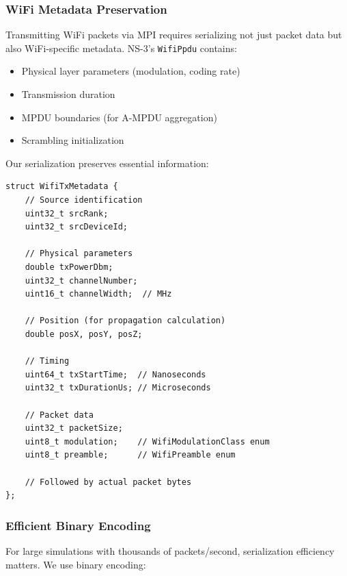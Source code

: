 \subsubsection{WiFi Metadata Preservation}

Transmitting WiFi packets via MPI requires serializing not just packet data but also WiFi-specific metadata. NS-3's \texttt{WifiPpdu} contains:

\begin{itemize}
    \item Physical layer parameters (modulation, coding rate)
    \item Transmission duration
    \item MPDU boundaries (for A-MPDU aggregation)
    \item Scrambling initialization
\end{itemize}

Our serialization preserves essential information:

\begin{lstlisting}[style=cpp, caption={WiFi packet serialization structure}]
struct WifiTxMetadata {
    // Source identification
    uint32_t srcRank;
    uint32_t srcDeviceId;
    
    // Physical parameters
    double txPowerDbm;
    uint32_t channelNumber;
    uint16_t channelWidth;  // MHz
    
    // Position (for propagation calculation)
    double posX, posY, posZ;
    
    // Timing
    uint64_t txStartTime;  // Nanoseconds
    uint32_t txDurationUs; // Microseconds
    
    // Packet data
    uint32_t packetSize;
    uint8_t modulation;    // WifiModulationClass enum
    uint8_t preamble;      // WifiPreamble enum
    
    // Followed by actual packet bytes
};
\end{lstlisting}

\subsubsection{Efficient Binary Encoding}

For large simulations with thousands of packets/second, serialization efficiency matters. We use binary encoding:

